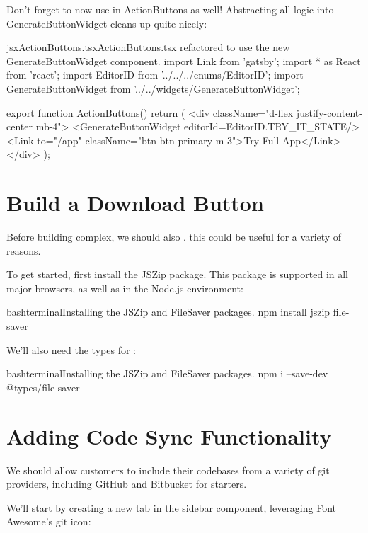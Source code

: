 \documentclass[a4paper,headinclude=on,footinclude=on,12pt,oneside]{scrbook}
\begin{document}
Don't forget to now use  in ActionButtons as well! Abstracting all logic into GenerateButtonWidget cleans up  quite nicely:

\begin{codeInput}{jsx}{ActionButtons.tsx}{ActionButtons.tsx refactored to use the new GenerateButtonWidget component.}
import { Link } from 'gatsby';
import * as React from 'react';
import EditorID from '../../../enums/EditorID';
import { GenerateButtonWidget } from '../../widgets/GenerateButtonWidget';

export function ActionButtons() {
  return (
    <div className="d-flex justify-content-center mb-4">
      <GenerateButtonWidget editorId={EditorID.TRY_IT_STATE}/>
      <Link to="/app" className="btn btn-primary m-3">Try Full App</Link>
    </div>
  );
}
\end{codeInput}



\section{Build a Download Button}

Before building complex, we should also . this could be useful for a variety of reasons.

To get started, first install the JSZip package. This package is supported in all major browsers, as well as in the Node.js environment:


\begin{codeInput}{bash}{terminal}{Installing the JSZip and FileSaver packages.}
npm install jszip file-saver 
\end{codeInput}

We'll also need the types for :

\begin{codeInput}{bash}{terminal}{Installing the JSZip and FileSaver packages.}
npm i --save-dev @types/file-saver
\end{codeInput}

\section{Adding Code Sync Functionality}

We should allow customers to include their codebases from a variety of git providers, including GitHub and Bitbucket for starters.

We'll start by creating a new tab in the sidebar component, leveraging Font Awesome's git icon:
\end{document}
